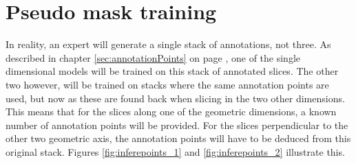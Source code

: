 \chapter{Pseudo mask training}
\par{
    In reality, an expert will generate a single stack of annotations, not three.
    As described in chapter \ref{sec:annotationPoints} on page \pageref{sec:annotationPoints}, one of the single dimensional models will be trained on this stack of annotated slices.
    The other two however, will be trained on stacks where the same annotation points are used, but now as these are found back when slicing in the two other dimensions.
    This means that for the slices along one of the geometric dimensions, a known number of annotation points will be provided.
    For the slices perpendicular to the other two geometric axis, the annotation points will have to be deduced from this original stack.
    Figures \ref{fig:inferepoints_1} and \ref{fig:inferepoints_2} illustrate this.
}

